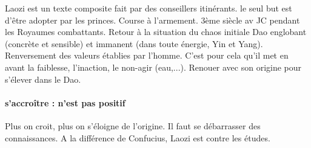 \begin{Synthesis}
    Laozi est un texte composite fait par des conseillers itinérants. le seul but est d'être adopter par les princes. Course à l'armement. 3ème siècle av JC pendant les Royaumes combattants.
    Retour à la situation du chaos initiale
    Dao englobant (concrète et sensible) et immanent (dans toute énergie, Yin et Yang). 
    Renversement des valeurs établies par l'homme.  C'est pour cela qu'il met en avant la faiblesse, l'inaction, le non-agir (eau,...). Renouer avec son origine pour s'élever dans le Dao.
\end{Synthesis}


\paragraph{s'accroître : n'est pas positif} Plus on croit, plus on s'éloigne de l'origine. Il faut se débarrasser des connaissances. A la différence de Confucius, Laozi est contre les études.
